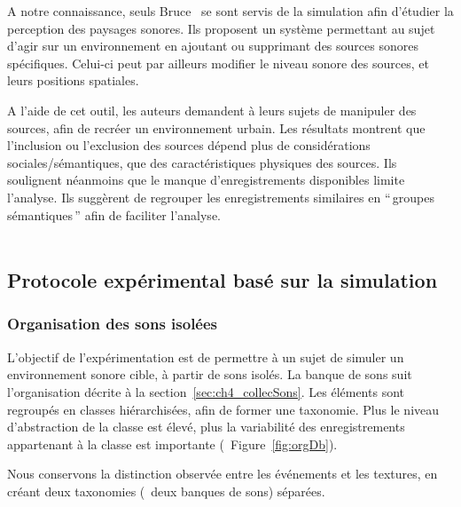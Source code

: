 A notre connaissance, seuls Bruce~\al \citep{bruce2009development,bruce2014effects} se sont servis de la simulation afin d'étudier la perception des paysages sonores. Ils proposent un système permettant au sujet d'agir sur un environnement en ajoutant ou supprimant des sources sonores spécifiques. Celui-ci peut par ailleurs modifier le niveau sonore des sources, et leurs positions spatiales.

A l'aide de cet outil, les auteurs demandent à leurs sujets de manipuler des sources, afin de recréer un environnement urbain. Les résultats montrent que l'inclusion ou l'exclusion des sources dépend plus de considérations sociales/sémantiques, que des caractéristiques physiques des sources. Ils soulignent néanmoins que le manque d'enregistrements disponibles limite l'analyse. Ils suggèrent de regrouper les enregistrements similaires en ``\,groupes sémantiques\,'' afin de faciliter l'analyse. \\

 \\

\subsection{Protocole expérimental basé sur la simulation}

\subsubsection{Organisation des sons isolées}
\label{sec:ch4_dbEventTexture}

L'objectif de l'expérimentation est de permettre à un sujet de simuler un environnement sonore cible, à partir de sons isolés. La banque de sons suit l'organisation décrite à la section~\ref{sec:ch4_collecSons}. Les éléments sont regroupés en classes hiérarchisées, afin de former une taxonomie. Plus le niveau d'abstraction de la classe est élevé, plus la variabilité des enregistrements appartenant à la classe est importante (\cf~Figure~\ref{fig:orgDb}).
 
Nous conservons la distinction observée entre les événements et les textures, en créant deux taxonomies (\ie~deux banques de sons) séparées.

